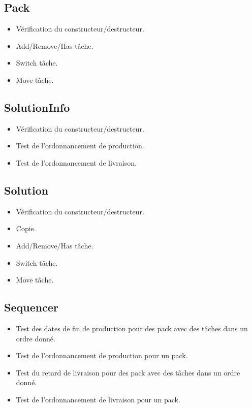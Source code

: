 \documentclass[hideweeklyreports]{polytech/polytech}
\begin{document}
			\subsection{Pack}
				\begin{itemize}
					\item Vérification du constructeur/destructeur.
					\item Add/Remove/Has tâche.
					\item Switch tâche.
					\item Move tâche.
				\end{itemize}
				
			\subsection{SolutionInfo}
				\begin{itemize}
					\item Vérification du constructeur/destructeur.
					\item Test de l'ordonnancement de production.
					\item Test de l'ordonnancement de livraison.
				\end{itemize}
				
			\subsection{Solution}
				\begin{itemize}
					\item Vérification du constructeur/destructeur.
					\item Copie.
					\item Add/Remove/Has tâche.
					\item Switch tâche.
					\item Move tâche.
				\end{itemize}
				
			\subsection{Sequencer}
				\begin{itemize}
					\item Test des dates de fin de production pour des pack avec des tâches dans un ordre donné.
					\item Test de l'ordonnancement de production pour un pack.
					\item Test du retard de livraison pour des pack avec des tâches dans un ordre donné.
					\item Test de l'ordonnancement de livraison pour un pack.
				\end{itemize}
				
\end{document}
